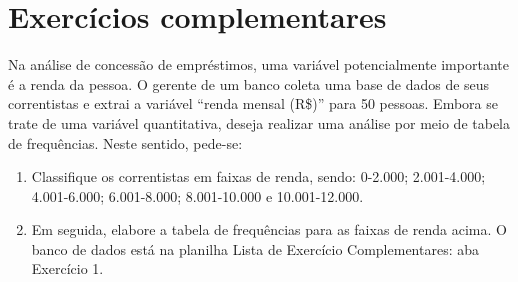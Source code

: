 \section{Exercícios complementares}%

\begin{exercise}
Na análise de concessão de empréstimos, uma variável potencialmente
importante é a renda da pessoa. O gerente de um banco coleta uma base de
dados de seus correntistas e extrai a variável ``renda mensal (R\$)'' para 50
pessoas. Embora se trate de uma variável quantitativa, deseja realizar uma
análise por meio de tabela de frequências. Neste sentido, pede-se:
\begin{enumerate}[label=\alph*)]
    \item Classifique os correntistas em faixas de renda, sendo: 0-2.000;
    2.001-4.000; 4.001-6.000; 6.001-8.000; 8.001-10.000 e 10.001-12.000.
    \item Em seguida, elabore a tabela de frequências para as faixas de renda
    acima. O banco de dados está na planilha Lista de Exercício Complementares:
    aba Exercício 1.
\end{enumerate}
\end{exercise}

